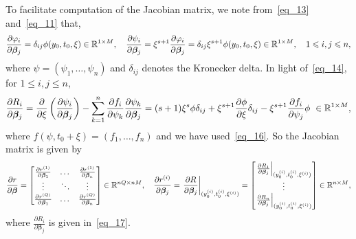 
To facilitate computation of the Jacobian matrix, we note from~\eqref{eq_13}
and~\eqref{eq_11} that,
\begin{equation}\label{eq_16}
  \frac{\partial\varphi_i}{\partial\bm\beta_j} = \delta_{ij}\phi(y_0,t_0,\xi)
  \in\mathbb{R}^{1\times M},
  \quad
  \frac{\partial\psi_i}{\partial\bm\beta_j} =
  \xi^{s+1}\frac{\partial\varphi_i}{\partial\bm\beta_j}
  = \delta_{ij}\xi^{s+1}\phi(y_0,t_0,\xi) \in\mathbb{R}^{1\times M},
  \quad 1\leqslant i,j\leqslant n,
\end{equation}
where $\psi = (\psi_1,\dots,\psi_n)$ and
$\delta_{ij}$ denotes the Kronecker delta.
In light of~\eqref{eq_14},
for $1\leqslant i,j\leqslant n$,
\begin{equation}\label{eq_17}
  \frac{\partial R_i}{\partial\bm\beta_j} =
  \frac{\partial}{\partial\xi}\left(\frac{\partial\psi_i}{\partial\bm\beta_j} \right)
  -\sum_{k=1}^n\frac{\partial f_i}{\partial\psi_k}\frac{\partial\psi_k}{\partial\bm\beta_j}
  = (s+1)\xi^s\phi\delta_{ij} + \xi^{s+1}\frac{\partial\phi}{\partial\xi}\delta_{ij}
   - \xi^{s+1}\frac{\partial f_i}{\partial\psi_j}\phi \ \in\mathbb{R}^{1\times M},
\end{equation}
where $f(\psi,t_0+\xi) = (f_1,\dots,f_n)$ and we have used~\eqref{eq_16}.
So the Jacobian matrix is given by
\begin{equation}\label{eq_18}
  \frac{\partial r}{\partial\bm\beta} = \begin{bmatrix}
    \frac{\partial r^{(1)}}{\partial\bm\beta_1} & \dots & \frac{\partial r^{(1)}}{\partial\bm\beta_n} \\
    \vdots & \ddots & \vdots \\
    \frac{\partial r^{(Q)}}{\partial\bm\beta_1} & \dots & \frac{\partial r^{(Q)}}{\partial\bm\beta_n}
  \end{bmatrix} \in\mathbb{R}^{nQ\times nM},
  \quad
  \frac{\partial r^{(i)}}{\partial\bm\beta_j} =
  \left.\frac{\partial R}{\partial\bm\beta_j}\right|_{(y_0^{(i)},t_0^{(i)},\xi^{(i)})}=
  \begin{bmatrix}
    \left.\frac{\partial R_1}{\partial\bm\beta_j}\right|_{(y_0^{(i)},t_0^{(i)},\xi^{(i)})} \\
    \vdots \\ \left.\frac{\partial R_n}{\partial\bm\beta_j}\right|_{(y_0^{(i)},t_0^{(i)},\xi^{(i)})}
  \end{bmatrix} \in\mathbb{R}^{n\times M},
\end{equation}
where $\frac{\partial R_i}{\partial\bm\beta_j}$ is given in~\eqref{eq_17}.


